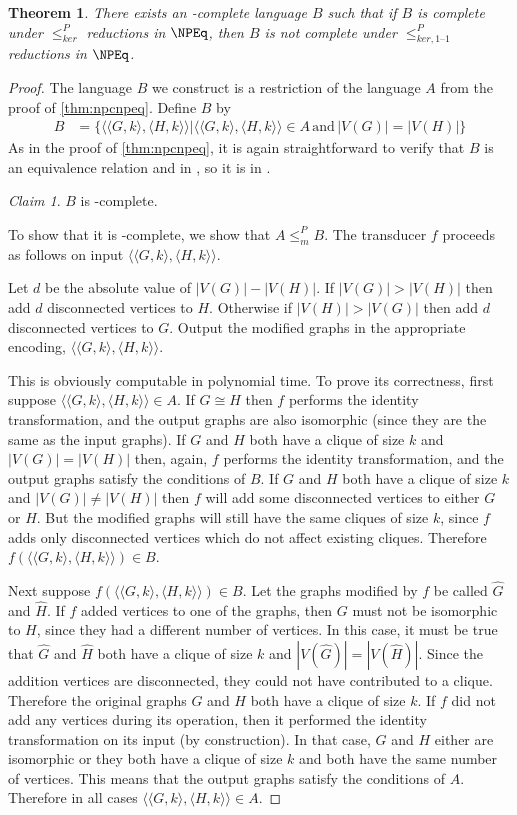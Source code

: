 \documentclass[draft]{article}
\newtheorem{theorem}{Theorem}[section]
\theoremstyle{definition} \newtheorem{openproblem}[openproblem]{Open problem}
\theoremstyle{definition} \newtheorem{definition}[definition]{Definition}
\theoremstyle{remark} \newtheorem{remark}[remark]{Remark}
\newtheorem{claim}{Claim}
\newcommand{\plain}[1]{\,\text{#1}\,} %
\newcommand{\kr}{\leq^{P}_{ker}} %
\newcommand{\kri}{\leq^{P}_{ker,1\text{--}1}} %
\newcommand{\mor}{\leq^{P}_{m}} %
\newcommand{\pair}[2]{\langle#1,#2\rangle} %
\begin{document}
\begin{theorem}
  There exists an \NP-complete language $B$ such that if $B$ is complete under $\kr$ reductions in $\NPEq$, then $B$ is not complete under $\kri$ reductions in $\NPEq$.
\end{theorem}
\begin{proof}
  The language $B$ we construct is a restriction of the language $A$ from the proof of \autoref{thm:npcnpeq}.
  Define $B$ by
  \begin{align*}
    B &= \{\pair{\pair{G}{k}}{\pair{H}{k}}|\pair{\pair{G}{k}}{\pair{H}{k}}\in A \plain{and} |V(G)|=|V(H)|\}
  \end{align*}
  As in the proof of \autoref{thm:npcnpeq}, it is again straightforward to verify that $B$ is an equivalence relation and in \NP, so it is in \NPEq.

  \begin{claim}
    $B$ is \NP-complete.
  \end{claim}
  To show that it is \NP-complete, we show that $A\mor B$.
  The transducer $f$ proceeds as follows on input $\pair{\pair{G}{k}}{\pair{H}{k}}$.

  Let $d$ be the absolute value of $|V(G)|-|V(H)|$.
  If $|V(G)|>|V(H)|$ then add $d$ disconnected vertices to $H$.
  Otherwise if $|V(H)|>|V(G)|$ then add $d$ disconnected vertices to $G$.
  Output the modified graphs in the appropriate encoding, $\pair{\pair{G}{k}}{\pair{H}{k}}$.

  This is obviously computable in polynomial time.
  To prove its correctness, first suppose $\pair{\pair{G}{k}}{\pair{H}{k}}\in A$.
  If $G\cong H$ then $f$ performs the identity transformation, and the output graphs are also isomorphic (since they are the same as the input graphs).
  If $G$ and $H$ both have a clique of size $k$ and $|V(G)|=|V(H)|$ then, again, $f$ performs the identity transformation, and the output graphs satisfy the conditions of $B$.
  If $G$ and $H$ both have a clique of size $k$ and $|V(G)|\neq|V(H)|$ then $f$ will add some disconnected vertices to either $G$ or $H$.
  But the modified graphs will still have the same cliques of size $k$, since $f$ adds only disconnected vertices which do not affect existing cliques.
  Therefore $f(\pair{\pair{G}{k}}{\pair{H}{k}})\in B$.

  Next suppose $f(\pair{\pair{G}{k}}{\pair{H}{k}})\in B$.
  Let the graphs modified by $f$ be called $\hat{G}$ and $\hat{H}$.
  If $f$ added vertices to one of the graphs, then $G$ must not be isomorphic to $H$, since they had a different number of vertices.
  In this case, it must be true that $\hat{G}$ and $\hat{H}$ both have a clique of size $k$ and $|V(\hat{G})|=|V(\hat{H})|$.
  Since the addition vertices are disconnected, they could not have contributed to a clique.
  Therefore the original graphs $G$ and $H$ both have a clique of size $k$.
  If $f$ did not add any vertices during its operation, then it performed the identity transformation on its input (by construction).
  In that case, $G$ and $H$ either are isomorphic or they both have a clique of size $k$ and both have the same number of vertices.
  This means that the output graphs satisfy the conditions of $A$.
  Therefore in all cases $\pair{\pair{G}{k}}{\pair{H}{k}}\in A$.


\end{proof}
\end{document}
